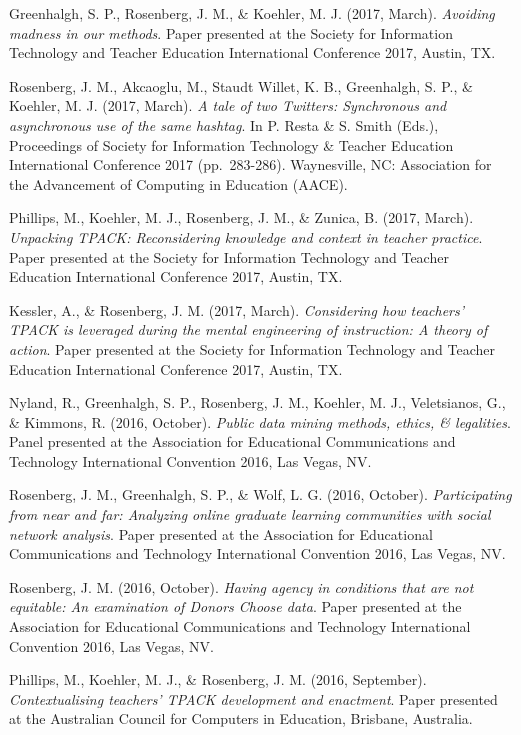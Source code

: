 \documentclass[]{article}
\begin{document}
Greenhalgh, S. P., Rosenberg, J. M., \& Koehler, M. J. (2017, March).
\emph{Avoiding madness in our methods}. Paper presented at the Society
for Information Technology and Teacher Education International
Conference 2017, Austin, TX.

Rosenberg, J. M., Akcaoglu, M., Staudt Willet, K. B., Greenhalgh, S. P.,
\& Koehler, M. J. (2017, March). \emph{A tale of two Twitters:
Synchronous and asynchronous use of the same hashtag}. In P. Resta \& S.
Smith (Eds.), Proceedings of Society for Information Technology \&
Teacher Education International Conference 2017 (pp.~283-286).
Waynesville, NC: Association for the Advancement of Computing in
Education (AACE).

Phillips, M., Koehler, M. J., Rosenberg, J. M., \& Zunica, B. (2017,
March). \emph{Unpacking TPACK: Reconsidering knowledge and context in
teacher practice}. Paper presented at the Society for Information
Technology and Teacher Education International Conference 2017, Austin,
TX.

Kessler, A., \& Rosenberg, J. M. (2017, March). \emph{Considering how
teachers' TPACK is leveraged during the mental engineering of
instruction: A theory of action}. Paper presented at the Society for
Information Technology and Teacher Education International Conference
2017, Austin, TX.

Nyland, R., Greenhalgh, S. P., Rosenberg, J. M., Koehler, M. J.,
Veletsianos, G., \& Kimmons, R. (2016, October). \emph{Public data
mining methods, ethics, \& legalities}. Panel presented at the
Association for Educational Communications and Technology International
Convention 2016, Las Vegas, NV.

Rosenberg, J. M., Greenhalgh, S. P., \& Wolf, L. G. (2016, October).
\emph{Participating from near and far: Analyzing online graduate
learning communities with social network analysis}. Paper presented at
the Association for Educational Communications and Technology
International Convention 2016, Las Vegas, NV.

Rosenberg, J. M. (2016, October). \emph{Having agency in conditions that
are not equitable: An examination of Donors Choose data}. Paper
presented at the Association for Educational Communications and
Technology International Convention 2016, Las Vegas, NV.

Phillips, M., Koehler, M. J., \& Rosenberg, J. M. (2016, September).
\emph{Contextualising teachers' TPACK development and enactment}. Paper
presented at the Australian Council for Computers in Education,
Brisbane, Australia.
\end{document}
